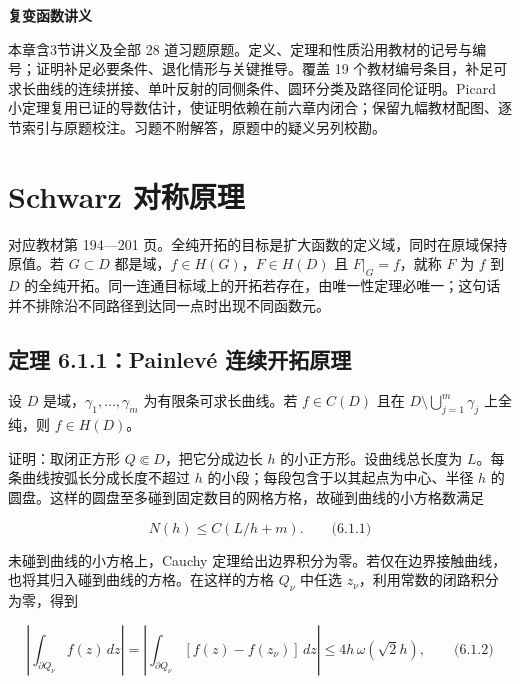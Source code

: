\documentclass[11pt,a4paper]{article}
\begin{document}
\begin{center}
{\LARGE\bfseries 复变函数讲义\par}
\vspace{8pt}{\large 第六章\quad 全纯开拓\par}
\vspace{6pt}{\small 依史济怀、刘太顺《复变函数》\quad 教材第 194—209 页\par}
\end{center}\vspace{8pt}
本章含3节讲义及全部 28 道习题原题。定义、定理和性质沿用教材的记号与编号；证明补足必要条件、退化情形与关键推导。覆盖 19 个教材编号条目，补足可求长曲线的连续拼接、单叶反射的同侧条件、圆环分类及路径同伦证明。Picard 小定理复用已证的导数估计，使证明依赖在前六章内闭合；保留九幅教材配图、逐节索引与原题校注。习题不附解答，原题中的疑义另列校勘。
\begingroup\setlength{\parskip}{0pt}\tableofcontents\endgroup\clearpage
\section{Schwarz 对称原理}
对应教材第 194---201
页。全纯开拓的目标是扩大函数的定义域，同时在原域保持原值。若
\(G\subset D\) 都是域，\(f\in H(G)\)，\(F\in H(D)\) 且 \(F|_G=f\)，就称
\(F\) 为 \(f\) 到 \(D\)
的全纯开拓。同一连通目标域上的开拓若存在，由唯一性定理必唯一；这句话并不排除沿不同路径到达同一点时出现不同函数元。

\subsection{定理 6.1.1：Painlevé 连续开拓原理}\label{ch06-s1-heading-1}

设 \(D\) 是域，\(\gamma_1,\ldots,\gamma_m\) 为有限条可求长曲线。若
\(f\in C(D)\) 且在 \(D\setminus\bigcup_{j=1}^m\gamma_j\) 上全纯，则
\(f\in H(D)\)。

证明：取闭正方形 \(Q\Subset D\)，把它分成边长 \(h\)
的小正方形。设曲线总长度为 \(L\)。每条曲线按弧长分成长度不超过 \(h\)
的小段；每段包含于以其起点为中心、半径 \(h\)
的圆盘。这样的圆盘至多碰到固定数目的网格方格，故碰到曲线的小方格数满足

\[
N(h)\le C(L/h+m).\qquad\text{(6.1.1)}
\]

未碰到曲线的小方格上，Cauchy
定理给出边界积分为零。若仅在边界接触曲线，也将其归入碰到曲线的方格。在这样的方格
\(Q_\nu\) 中任选 \(z_\nu\)，利用常数的闭路积分为零，得到

\[
\left|\int_{\partial Q_\nu}f(z)\,dz\right|
=\left|\int_{\partial Q_\nu}[f(z)-f(z_\nu)]\,dz\right|
\le 4h\,\omega(\sqrt2h),\qquad\text{(6.1.2)}
\]
\end{document}
